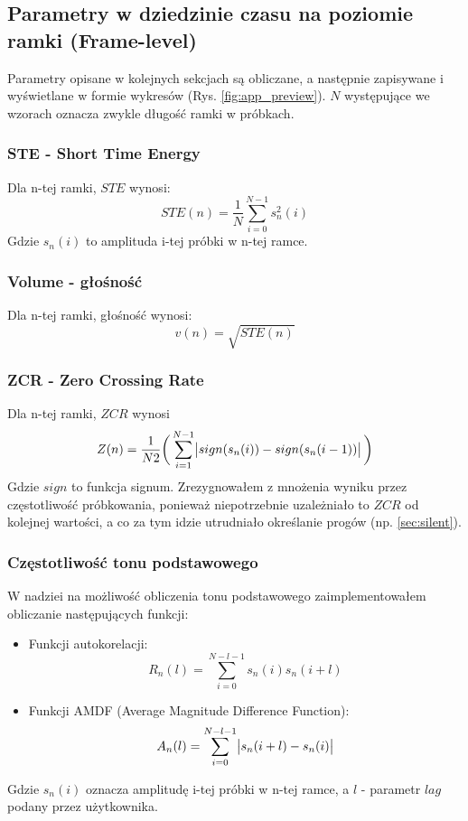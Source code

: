 \documentclass[12pt,a4paper]{article}
\begin{document}
\subsection{Parametry w dziedzinie czasu na poziomie ramki (Frame-level)\label{sec:framelevel}}
Parametry opisane w kolejnych sekcjach są obliczane, a następnie zapisywane i wyświetlane w formie
wykresów (Rys. \ref{fig:app_preview}). $N$ występujące we wzorach oznacza zwykle długość ramki w
próbkach.

\subsubsection{STE - Short Time Energy\label{sec:ste}}
Dla n-tej ramki, $STE$ wynosi:
\begin{equation}
    STE(n)=\frac{1}{N}\sum_{i=0}^{N-1}s_n^2(i)
\end{equation}
Gdzie $s_n(i)$ to amplituda i-tej próbki w n-tej ramce.

\subsubsection{Volume - głośność\label{sec:volume}}
Dla n-tej ramki, głośność wynosi:
\begin{equation}
    v(n)=\sqrt{STE(n)}
\end{equation}

\subsubsection{ZCR - Zero Crossing Rate\label{sec:zcr}}
Dla n-tej ramki, $ZCR$ wynosi
\begin{equation}
    Z(n)=\frac{1}{N2}\bigg(
        \sum_{i=1}^{N-1} \abs{sign(s_n(i))-sign(s_n(i-1))}
    \bigg)
\end{equation}
Gdzie $sign$ to funkcja signum. Zrezygnowałem z mnożenia wyniku przez częstotliwość próbkowania,
ponieważ niepotrzebnie uzależniało to $ZCR$ od kolejnej wartości, a co za tym idzie utrudniało
określanie progów (np. \ref{sec:silent}).

\subsubsection{Częstotliwość tonu podstawowego\label{sec:f0}}
W nadziei na możliwość obliczenia tonu podstawowego zaimplementowałem obliczanie następujących
funkcji:
\begin{itemize}
\item
    Funkcji autokorelacji:
    \begin{equation}
        R_n(l)=\sum_{i=0}^{N-l-1}s_n(i)s_n(i+l)
    \end{equation}
\item
    Funkcji AMDF (Average Magnitude Difference Function):
    \begin{equation}
        A_n(l)=\sum_{i=0}^{N-l-1}\abs{s_n(i+l)-s_n(i)}
    \end{equation}
\end{itemize}
Gdzie $s_n(i)$ oznacza amplitudę i-tej próbki w n-tej ramce, a $l$ - parametr $lag$ podany przez
użytkownika.
\end{document}
